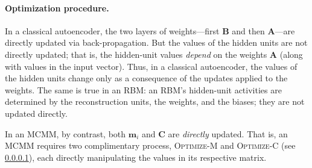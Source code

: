 %
%

\paragraph{Optimization procedure.}  In a classical autoencoder, the two layers of 
weights---first $\textbf{B}$ and then $\textbf{A}$---are directly updated via back-propagation. 
But the values of the hidden units are not directly updated; that is, the hidden-unit values 
\emph{depend} on the weights $\textbf{A}$ (along with values in the input vector). 
Thus, in a classical autoencoder, the values of the hidden units change only as a 
consequence of the updates applied to the weights. The same is true in an RBM: an RBM's hidden-unit activities are determined by
the reconstruction units, the weights, and the biases; they are not updated directly.

In an MCMM, by contrast, both $\textbf{m}_i$ and $\textbf{C}$ are \emph{directly} updated. 
That is, an MCMM requires two complimentary process, \textsc{Optimize-M} 
and \textsc{Optimize-C} (see \ref{}), each directly manipulating the values in its respective matrix. 






